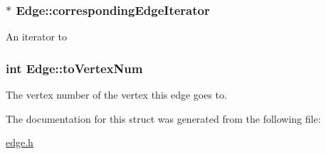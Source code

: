 \subsubsection[{\texorpdfstring{corresponding\+Edge\+Iterator}{correspondingEdgeIterator}}]{$\ast$ Edge\+::corresponding\+Edge\+Iterator}\hypertarget{structEdge_a3cf54ba60e278bb26d3b39756f806ea1}{}\label{structEdge_a3cf54ba60e278bb26d3b39756f806ea1}
An iterator to 
\subsubsection[{\texorpdfstring{to\+Vertex\+Num}{toVertexNum}}]{\setlength{\rightskip}{0pt plus 5cm}int Edge\+::to\+Vertex\+Num}\hypertarget{structEdge_affa54ce2dd876532f6b87fc049f5bd7d}{}\label{structEdge_affa54ce2dd876532f6b87fc049f5bd7d}
The vertex number of the vertex this edge goes to. 

The documentation for this struct was generated from the following file\+:\begin{DoxyCompactItemize}
\item 
\hyperlink{edge_8h}{edge.\+h}\end{DoxyCompactItemize}

